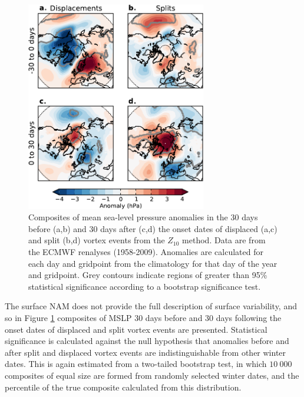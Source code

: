 \begin{figure}
 \centering
 \noindent\includegraphics[width=0.7\textwidth]{figures/chapter-moments/mslp_composites_colbar_crop.pdf}
 \caption[Mean sea-level pressure composites for split and displaced vortex
 events.]{Composites of mean sea-level pressure anomalies in the 30 days before
   (a,b) and 30 days after (c,d) the onset dates of displaced (a,c) and split
   (b,d) vortex events from the $Z_{10}$ method. Data are from the ECMWF
   renalyses (1958-2009). Anomalies are calculated for each day and gridpoint
   from the climatology for that day of the year and gridpoint. Grey contours
   indicate regions of greater than 95\% statistical significance according to a
   bootstrap significance test.}
 \label{fig:mslp_composites}
\end{figure}

The surface NAM does not provide the full description of surface variability,
and so in Figure \ref{fig:mslp_composites} composites of MSLP 30 days before and
30 days following the onset dates of displaced and split vortex events are
presented. Statistical significance is calculated against the null hypothesis
that anomalies before and after split and displaced vortex events are
indistinguishable from other winter dates. This is again estimated from a
two-tailed bootstrap test, in which $10~000$ composites of equal size are formed
from randomly selected winter dates, and the percentile of the true composite
calculated from this distribution.

